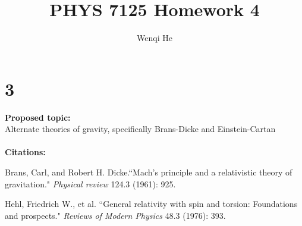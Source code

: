 \documentclass{article}
\title{PHYS 7125 Homework 4}
\author{Wenqi He}
\begin{document}
\section*{3}
\textbf{Proposed topic:}\\
Alternate theories of gravity, specifically Brans-Dicke and Einstein-Cartan\\\\
\textbf{Citations:}

Brans, Carl, and Robert H. Dicke.``Mach's principle and a relativistic theory of gravitation." \textit{Physical review} 124.3 (1961): 925.

Hehl, Friedrich W., et al. ``General relativity with spin and torsion: Foundations and prospects." \textit{Reviews of Modern Physics} 48.3 (1976): 393.
\end{document}
